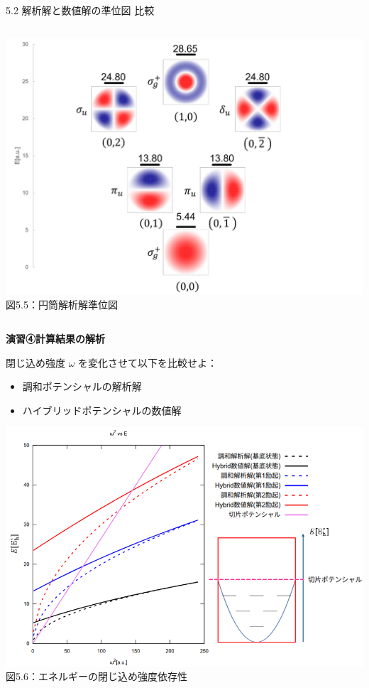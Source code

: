 \documentclass{beamer}
\begin{document}
\begin{frame}{5.2 解析解と数値解の準位図
    比較}
\begin{columns}[t]
          \begin{center}
            \includegraphics[width=1.30\linewidth]{images/円筒準位図.png} \\
            \scriptsize 図5.5：円筒解析解準位図
          \end{center}


          \end{columns}
          

    
    \end{frame}
    
    \begin{frame}{}
      \textbf{演習④\quad 計算結果の解析}
    
          閉じ込め強度 $\omega$ を変化させて以下を比較せよ：
          \begin{itemize}
            \item 調和ポテンシャルの解析解
            \item ハイブリッドポテンシャルの数値解
          \end{itemize}
          
          \begin{center}
            \includegraphics[width=0.92\linewidth]{images/閉じ込め強度変化改.png} \\
            図5.6：エネルギーの閉じ込め強度依存性
          \end{center}
    
    \end{frame}
    
\end{document}
